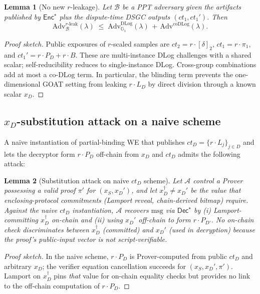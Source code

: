 \documentclass[11pt]{article}
\newtheorem{lemma}{Lemma}
\newcommand{\Gone}{\mathbb{G}_1}
\newcommand{\deltatwo}{[\delta]_2}
\newcommand{\msg}{\mathrm{msg}}
\newcommand{\Enc}{\mathsf{Enc}}
\newcommand{\Dec}{\mathsf{Dec}}
\newcommand{\Adv}{\mathrm{Adv}}
\begin{document}
\begin{lemma}[No new $r$-leakage]\label{lem:r-leak}
Let $\mathcal{B}$ be a PPT adversary given the artifacts published
by $\Enc^\star$ plus the dispute-time DSGC outputs $(ct_1, ct_1')$.
Then
\[
  \Adv^{r\text{-leak}}_{\mathcal{B}}(\lambda)
  \;\leq\;
  \Adv^{\mathrm{DLog}}_{\Gone}(\lambda) \,+\, \Adv^{\mathrm{coDLog}}(\lambda).
\]
\end{lemma}

\begin{proof}[Proof sketch]
Public exposures of $r$-scaled samples are $ct_2 = r \cdot \deltatwo$,
$ct_1 = r \cdot \pi_1$, and
$ct_1' = r \cdot P_D + r \cdot B$. These are
multi-instance DLog challenges with a shared scalar; self-reducibility
reduces to single-instance DLog. Cross-group combinations add at
most a co-DLog term. In particular, the blinding term prevents the
one-dimensional GOAT setting from leaking $r \cdot L_D$ by direct
division through a known scalar $x_D$.
\end{proof}

\subsection{$x_D$-substitution attack on a naive scheme}\label{sec:subst}

A na\"{i}ve instantiation of partial-binding WE that publishes
$ct_D = \{r \cdot L_j\}_{j \in D}$ and lets the decryptor form
$r \cdot P_D$ off-chain from $x_D$ and $ct_D$ admits the following
attack:

\begin{lemma}[Substitution attack on naive $ct_D$ scheme]\label{lem:attack}
Let $\mathcal{A}$ control a Prover possessing a valid proof $\pi'$
for $(x_S, x_D')$, and let $x_D^\dagger \neq x_D'$ be the value that
enclosing-protocol commitments (Lamport reveal, chain-derived
bitmap) require. Against the naive $ct_D$ instantiation, $\mathcal{A}$
recovers $\msg$ via $\Dec^\star$ by (i) Lamport-committing
$x_D^\dagger$ on-chain and (ii) using $x_D'$ off-chain to form
$r \cdot P_{D'}$. No on-chain check discriminates between
$x_D^\dagger$ (committed) and $x_D'$ (used in decryption) because
the proof's public-input vector is not script-verifiable.
\end{lemma}

\begin{proof}[Proof sketch]
In the naive scheme, $r \cdot P_D$ is Prover-computed from public
$ct_D$ and arbitrary $x_D$; the verifier equation cancellation
succeeds for $(x_S, x_D', \pi')$. Lamport on $x_D^\dagger$ pins
\emph{that} value for on-chain equality checks but provides no link
to the off-chain computation of $r \cdot P_D$.
\end{proof}
\end{document}
